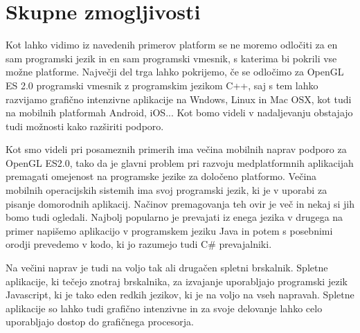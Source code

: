 \section{Skupne zmogljivosti}

Kot lahko vidimo iz navedenih primerov platform se ne moremo odločiti za en sam programski jezik in en sam programski vmesnik, s katerima bi pokrili vse možne platforme. Največji del trga lahko pokrijemo, če se odločimo za OpenGL ES 2.0 programski vmesnik z programskim jezikom C++, saj s tem lahko razvijamo grafično intenzivne aplikacije na Wndows, Linux in Mac OSX, kot tudi na mobilnih platformah Android, iOS... Kot bomo videli v nadaljevanju obstajajo tudi možnosti kako razširiti podporo.

Kot smo videli pri posameznih primerih ima večina mobilnih naprav podporo za OpenGL ES2.0, tako da je glavni problem pri razvoju medplatformnih aplikacijah premagati omejenost na programske jezike za določeno platformo. Večina mobilnih operacijskih sistemih ima svoj programski jezik, ki je v uporabi za pisanje domorodnih aplikacij. Načinov premagovanja teh ovir je več in nekaj si jih bomo tudi ogledali. Najbolj popularno je prevajati iz enega jezika v drugega na primer napišemo aplikacijo v programskem jeziku Java in potem s posebnimi orodji prevedemo v kodo, ki jo razumejo tudi C\# prevajalniki.

Na večini naprav je tudi na voljo tak ali drugačen spletni brskalnik. Spletne aplikacije, ki tečejo znotraj brskalnika, za izvajanje uporabljajo programski jezik Javascript, ki je tako eden redkih jezikov, ki je na voljo na vseh napravah. Spletne aplikacije so lahko tudi grafično intenzivne in za svoje delovanje lahko celo uporabljajo dostop do grafičnega procesorja.





